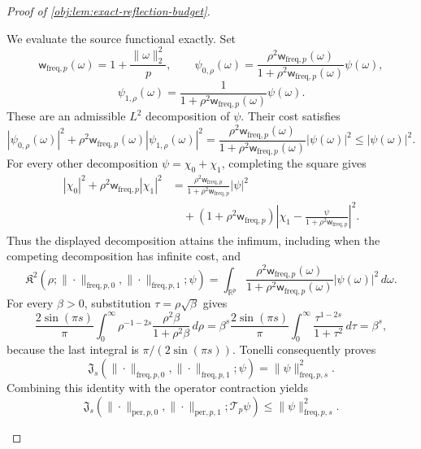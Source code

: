 \begin{proof}[Proof of \cref{obj:lem:exact-reflection-budget}]
\begin{enumerate}
We evaluate the source functional exactly. Set
\[
\mathsf w_{\mathrm{freq},p}(\omega)
=
1+\frac{\|\omega\|_2^2}{p},
\qquad
\psi_{0,\rho}(\omega)
=
\frac{\rho^2\mathsf w_{\mathrm{freq},p}(\omega)}
{1+\rho^2\mathsf w_{\mathrm{freq},p}(\omega)}\psi(\omega),
\]
\[
\psi_{1,\rho}(\omega)
=
\frac{1}{1+\rho^2\mathsf w_{\mathrm{freq},p}(\omega)}\psi(\omega).
\]
These are an admissible \(L^2\) decomposition of \(\psi\). Their cost satisfies
\[
|\psi_{0,\rho}(\omega)|^2+
\rho^2\mathsf w_{\mathrm{freq},p}(\omega)
|\psi_{1,\rho}(\omega)|^2
=
\frac{\rho^2\mathsf w_{\mathrm{freq},p}(\omega)}
{1+\rho^2\mathsf w_{\mathrm{freq},p}(\omega)}
|\psi(\omega)|^2
\leq|\psi(\omega)|^2.
\]
For every other decomposition
\(\psi=\chi_0+\chi_1\), completing the square gives
\[
\begin{aligned}
|\chi_0|^2+\rho^2\mathsf w_{\mathrm{freq},p}|\chi_1|^2
&=
\frac{\rho^2\mathsf w_{\mathrm{freq},p}}
{1+\rho^2\mathsf w_{\mathrm{freq},p}}|\psi|^2\\
&\quad+
(1+\rho^2\mathsf w_{\mathrm{freq},p})
\left|
\chi_1-\frac{\psi}{1+\rho^2\mathsf w_{\mathrm{freq},p}}
\right|^2.
\end{aligned}
\]
Thus the displayed decomposition attains the infimum, including when the competing decomposition has infinite cost, and
\[
\mathfrak K^2\!\left(
\rho;
\|\cdot\|_{\mathrm{freq},p,0},
\|\cdot\|_{\mathrm{freq},p,1};
\psi
\right)
=
\int_{\mathbb R^p}
\frac{\rho^2\mathsf w_{\mathrm{freq},p}(\omega)}
{1+\rho^2\mathsf w_{\mathrm{freq},p}(\omega)}
|\psi(\omega)|^2\,d\omega.
\]
For every \(\beta>0\), substitution
\(\tau=\rho\sqrt{\beta}\) gives
\[
\frac{2\sin(\pi s)}{\pi}
\int_0^\infty
\rho^{-1-2s}\frac{\rho^2\beta}{1+\rho^2\beta}\,d\rho
=
\beta^s\frac{2\sin(\pi s)}{\pi}
\int_0^\infty\frac{\tau^{1-2s}}{1+\tau^2}\,d\tau
=
\beta^s,
\]
because the last integral is \(\pi/(2\sin(\pi s))\).
Tonelli consequently proves
\[
\mathfrak J_s\!\left(
\|\cdot\|_{\mathrm{freq},p,0},
\|\cdot\|_{\mathrm{freq},p,1};
\psi
\right)
=
\|\psi\|_{\mathrm{freq},p,s}^2.
\]
Combining this identity with the operator contraction yields
\[
\mathfrak J_s\!\left(
\|\cdot\|_{\mathrm{per},p,0},
\|\cdot\|_{\mathrm{per},p,1};
\mathscr T_p\psi
\right)
\leq
\|\psi\|_{\mathrm{freq},p,s}^2.
\]


\end{enumerate}
\end{proof}
